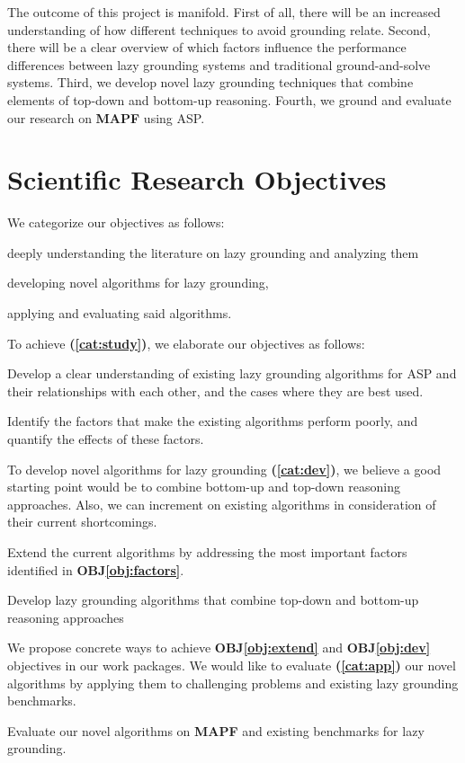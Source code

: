 \documentclass[a4paper,11pt]{article}
\newcommand\OBJref[1]{\textbf{OBJ\ref{#1}}}
\newcommand\CATref[1]{\textbf{(\ref{#1})}}
\def\mapf{{\bf MAPF}\xspace}
\begin{document}
The outcome of this project is manifold. 
First of all, there will be an increased understanding of how different techniques to avoid grounding relate.
Second, there will be a clear overview of which factors influence the performance differences between lazy grounding systems and traditional ground-and-solve systems. 
Third, we develop novel lazy grounding techniques that combine elements of top-down and bottom-up reasoning.
Fourth, we ground and evaluate our research on \mapf using ASP. 

\section{Scientific Research Objectives}


We categorize our objectives as follows: \begin{inparaenum}
\item \label{cat:study} deeply understanding the literature on lazy grounding and analyzing them 
\item \label{cat:dev} developing novel algorithms for lazy grounding, 
\item \label{cat:app} applying and evaluating said algorithms.
\end{inparaenum}
 To achieve \CATref{cat:study}, we elaborate our objectives as follows:
 
 \begin{OBJ} \label{obj:literature} Develop a clear understanding of existing lazy grounding algorithms for ASP and their relationships with each other, and the cases where they are best used.
 \end{OBJ}
\begin{OBJ} \label{obj:factors} Identify the factors that make the existing algorithms perform poorly, and quantify the effects of these factors.
 \end{OBJ}
To develop novel algorithms for lazy grounding \CATref{cat:dev}, we believe a good starting point would be to combine bottom-up and top-down reasoning approaches. Also, we can increment on existing algorithms in consideration of their current shortcomings. 
\begin{OBJ} \label{obj:extend} Extend the current algorithms by addressing the most important factors identified in \OBJref{obj:factors}.
 \end{OBJ}
\begin{OBJ} \label{obj:dev} Develop lazy grounding algorithms that combine top-down and bottom-up reasoning approaches
 \end{OBJ}
We propose concrete ways to achieve \OBJref{obj:extend} and \OBJref{obj:dev} objectives in our work packages.
We would like to evaluate \CATref{cat:app} our novel algorithms by applying them to challenging problems and existing lazy grounding benchmarks.
\begin{OBJ} \label{evaluate} Evaluate our novel algorithms on \mapf and existing benchmarks for lazy grounding.
 \end{OBJ}
\end{document}
